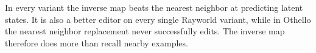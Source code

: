 \documentclass{article} %
\begin{document}
In every variant the inverse map beats the nearest neighbor at predicting latent states. It is also a better editor on every single Rayworld variant, while in Othello the nearest neighbor replacement never successfully edits. The inverse map therefore does more than recall nearby examples.

\end{document}
